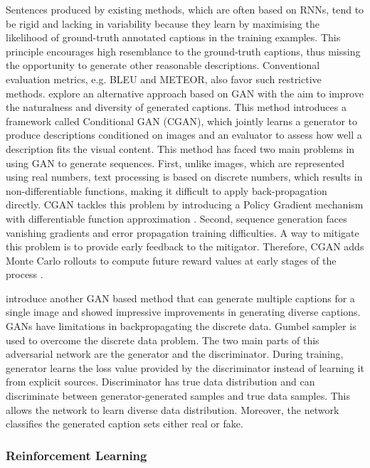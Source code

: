 Sentences produced by existing methods, which are often based on RNNs, tend to be rigid and lacking in variability because they learn by maximising the likelihood of ground-truth annotated captions in the training examples. This principle encourages high resemblance to the ground-truth captions, thus missing the opportunity to generate other reasonable descriptions. Conventional evaluation metrics, e.g. BLEU and METEOR, also favor such restrictive methods. \citet{Dai2017} explore an alternative approach based on GAN with the aim to improve the naturalness and diversity of generated captions. This method introduces a framework called Conditional GAN (CGAN), which jointly learns a generator to produce descriptions conditioned on images and an evaluator to assess how well a description fits the visual content. This method has faced two main problems in using GAN to generate sequences. First, unlike images, which are represented using real numbers, text processing is based on discrete numbers, which results in non-differentiable functions, making it difficult to apply back-propagation directly. CGAN tackles this problem by introducing a Policy Gradient mechanism with differentiable function approximation \citep{Sutton1999}. Second, sequence generation faces vanishing gradients and error propagation training difficulties. A way to mitigate this problem is to provide early feedback to the mitigator. Therefore, CGAN adds Monte Carlo rollouts to compute future reward values at early stages of the process \citep{Yu2017}.

\cite{Shetty2017} introduce another GAN based method that can generate multiple captions for a single image and showed impressive improvements in generating diverse captions. GANs have limitations in backpropagating the discrete data. Gumbel sampler \citep{Jang2017} is used to overcome the discrete data problem. The two main parts of this adversarial network are the generator and the discriminator. During training, generator learns the loss value provided by the discriminator instead of learning it from explicit sources. Discriminator has true data distribution and can discriminate between generator-generated samples and true data samples. This allows the network to learn diverse data distribution. Moreover, the network classifies the generated caption sets either real or fake.

\subsubsection{Reinforcement Learning}

